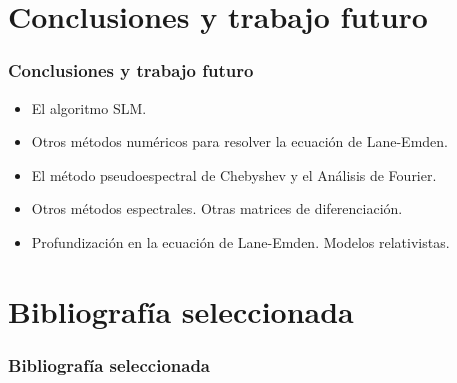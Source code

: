 \documentclass[ xcolor={svgnames},
  hyperref={colorlinks=false}]{beamer}
\begin{document}
	
	
	
	


	\section{Conclusiones y trabajo futuro}
	\begin{frame}
		\frametitle{Conclusiones y trabajo futuro}
		\begin{itemize}
			\item<tri@1-> El algoritmo SLM.
			\item<tri@1-> Otros métodos numéricos para resolver la ecuación de	Lane-Emden.
			\item<tri@1-> El método pseudoespectral de Chebyshev y el Análisis de Fourier.
			\item<tri@1-> Otros métodos espectrales. Otras matrices de diferenciación.
			\item<tri@1-> Profundización en la ecuación de Lane-Emden. Modelos relativistas.
		\end{itemize} 
	\end{frame}

	\section{Bibliografía seleccionada}	
	\begin{frame}[t,allowframebreaks]
		\frametitle{Bibliografía seleccionada}
		\nocite{binney2011galactic, chandrasekhar1957introduction, trefethen2000spectral, boyd2001chebyshev, article, Boyd_11,  					     fornberg1998practical}
		\AtNextBibliography{\footnotesize}
		\printbibliography
	\end{frame}
\end{document}
